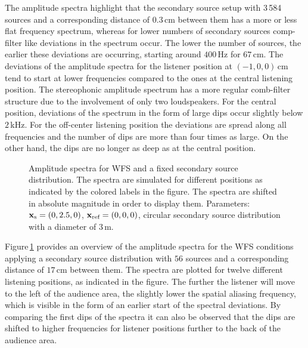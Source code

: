 The amplitude spectra highlight that the secondary source setup with 3\,584
sources and a corresponding distance of $0.3$\,cm between them has a more or
less flat frequency spectrum, whereas for lower numbers of secondary sources
comp-filter like deviations in the spectrum occur. The lower the number of
sources, the earlier these deviations are occurring, starting around $400$\,Hz for 
$67$\,cm.
The deviations of the amplitude spectra for the listener position
at $(-1,0,0)$\,cm tend to start at lower frequencies compared to the ones at the central
listening position.
The stereophonic amplitude spectrum has a more regular comb-filter structure due
to the involvement of only two loudspeakers. For the central position, deviations
of the spectrum in the form of large dips occur slightly below $2$\,kHz.
For the off-center listening position the deviations are spread along all
frequencies and the number of dips are more than four times as large. On the
other hand, the dips are no longer as deep as at the central position.

\begin{figure}
    \small
    \centering
    
    \caption{Amplitude spectra for \ac{WFS} and a fixed secondary source
    distribution. The spectra are simulated for different positions as
    indicated by the colored labels in the figure.
    The spectra are shifted in absolute magnitude in order to display
    them.
    Parameters: $\mathbf{x}_\text{s} = (0,2.5,0)$, $\mathbf{x}_\text{ref} = (0,0,0)$, circular secondary source
    distribution with a diameter of $3$\,m.
    }
    \label{fig:coloration_freq_response_moving}
\end{figure}
%
Figure\,\ref{fig:coloration_freq_response_moving} provides an overview of the amplitude
spectra for the \ac{WFS} conditions applying a secondary source distribution
with $56$ sources and a corresponding distance of $17$\,cm between them. The
spectra are plotted for twelve different listening positions, as indicated in
the figure. The further the listener will move to the left of the audience area,
the slightly lower the spatial aliasing frequency, which is visible in the form
of an earlier start of the spectral deviations. By comparing the
first dips of the spectra it can also be observed that the dips are shifted to
higher frequencies for listener positions further to the back of the audience
area.


